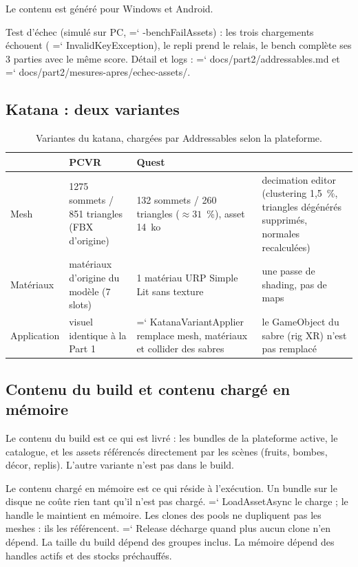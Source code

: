 \documentclass[11pt,a4paper]{article}
\newcommand{\fichier}[1]{\texttt{\small #1}}
\renewcommand{\texttt}[1]{%
  {\ttfamily\hyphenchar\font=`\/ \hyphenpenalty=50 \exhyphenpenalty=50 #1}}
\begin{document}
Le contenu est généré pour Windows et Android.

Test d'échec (simulé sur PC, \texttt{-benchFailAssets}) : les trois chargements échouent
(\texttt{InvalidKeyException}), le repli prend le relais, le bench complète ses 3
parties avec le même score. Détail et logs : \fichier{docs/part2/addressables.md} et
\fichier{docs/part2/mesures-apres/echec-assets/}.

\subsection{Katana : deux variantes}

\begin{table}[H]
\centering\small
\caption{Variantes du katana, chargées par Addressables selon la plateforme.}
\begin{tabularx}{\textwidth}{@{}P{2.2cm}P{3.4cm}P{3.2cm}L@{}}
\toprule
 & PCVR & Quest & \\
\midrule
Mesh & 1275 sommets / 851 triangles (FBX d'origine) & 132 sommets / 260 triangles ($\approx 31$~\%), asset 14~ko & decimation editor (clustering 1,5~\%, triangles dégénérés supprimés, normales recalculées) \\
Matériaux & matériaux d'origine du modèle (7 slots) & 1 matériau URP Simple Lit sans texture & une passe de shading, pas de maps \\
Application & visuel identique à la Part 1 & \texttt{KatanaVariant\allowbreak Applier} remplace mesh, matériaux et collider des sabres & le GameObject du sabre (rig XR) n'est pas remplacé \\
\bottomrule
\end{tabularx}
\end{table}

\subsection{Contenu du build et contenu chargé en mémoire}

Le contenu du build est ce qui est livré : les bundles de la plateforme active, le
catalogue, et les assets référencés directement par les scènes (fruits, bombes, décor,
replis). L'autre variante n'est pas dans le build.

Le contenu chargé en mémoire est ce qui réside à l'exécution. Un bundle sur le disque
ne coûte rien tant qu'il n'est pas chargé. \texttt{LoadAssetAsync} le charge ; le handle
le maintient en mémoire. Les clones des pools ne dupliquent pas les meshes : ils les
référencent. \texttt{Release} décharge quand plus aucun clone n'en dépend. La taille du
build dépend des groupes inclus. La mémoire dépend des handles actifs et des stocks
préchauffés.
\end{document}
